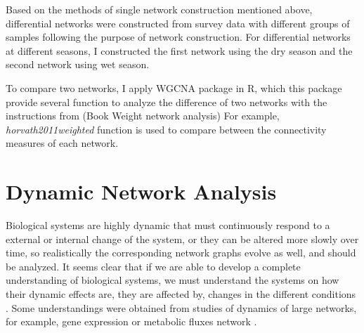 Based on the methods of single network construction mentioned above, differential networks were constructed from survey data with different groups of samples following the purpose of network construction. For differential networks at different seasons, I constructed the first network using the dry season and the second network using wet season. 

To compare two networks, I apply WGCNA package in R, which this package provide several function to analyze the   difference of two networks with the instructions from (Book Weight network analysis) For example, \textit{horvath2011weighted} function is used to compare between the connectivity measures of each network. 



 

\section*{Dynamic Network Analysis} %

Biological systems are highly dynamic that must continuously respond to a external or internal change of the system, or they can be altered more slowly over time, so realistically the corresponding network graphs evolve as well, and should be analyzed. It seems clear that if we are able to develop a complete understanding of biological systems, we must understand the systems on how their dynamic effects are, they are affected by, changes in the different conditions . Some understandings were obtained from studies of dynamics of large networks, for example, gene expression or metabolic fluxes network .

